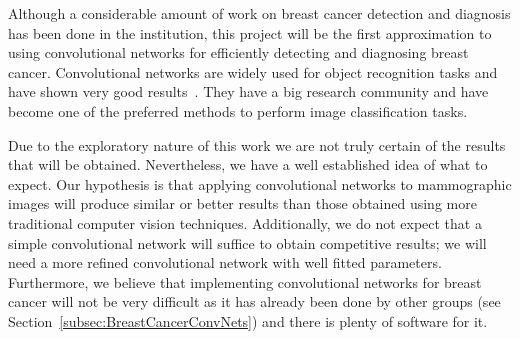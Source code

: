 Although a considerable amount of work on breast cancer detection and diagnosis has been done in the institution, this project will be the first approximation to using convolutional networks for efficiently detecting and diagnosing breast cancer. Convolutional networks are widely used for object recognition tasks and have shown very good results~\cite{Russakovsky2014, Taigman2014, Dieleman2015}. They have a big research community and have become one of the preferred methods to perform image classification tasks.%

Due to the exploratory nature of this work we are not truly certain of the results that will be obtained. Nevertheless, we have a well established idea of what to expect. Our hypothesis is that applying convolutional networks to mammographic images will produce similar or better results than those obtained using more traditional computer vision techniques. Additionally, we do not expect that a simple convolutional network will suffice to obtain competitive results; we will need a more refined convolutional network with well fitted parameters. Furthermore, we believe that implementing convolutional networks for breast cancer will not be very difficult as it has already been done by other groups (see Section~\ref{subsec:BreastCancerConvNets}) and there is plenty of software for it. 

